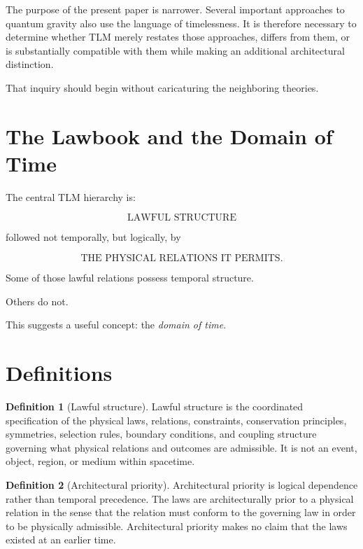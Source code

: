 \documentclass[12pt,onecolumn]{article}
\theoremstyle{plain}
\theoremstyle{definition}
\newtheorem{definition}{Definition}
\theoremstyle{remark}
\begin{document}
The purpose of the present paper is narrower. Several important approaches
to quantum gravity also use the language of timelessness. It is therefore
necessary to determine whether TLM merely restates those approaches, differs
from them, or is substantially compatible with them while making an
additional architectural distinction.

That inquiry should begin without caricaturing the neighboring theories.


\section{The Lawbook and the Domain of Time}

\label{sec:lawbook}

The central TLM hierarchy is:

\[
\boxed{\text{LAWFUL STRUCTURE}}
\]

followed not temporally, but logically, by

\[
\boxed{\text{THE PHYSICAL RELATIONS IT PERMITS}.}
\]

Some of those lawful relations possess temporal structure.

Others do not.

This suggests a useful concept: the \emph{domain of time}.

\section{Definitions}
\label{sec:definitions}

\begin{definition}[Lawful structure]
\label{def:lawfulstructure}
Lawful structure is the coordinated specification of the physical laws,
relations, constraints, conservation principles, symmetries, selection
rules, boundary conditions, and coupling structure governing what physical
relations and outcomes are admissible. It is not an event, object, region,
or medium within spacetime.
\end{definition}

\begin{definition}[Architectural priority]
\label{def:architecturalpriority}
Architectural priority is logical dependence rather than temporal
precedence. The laws are architecturally prior to a physical relation in
the sense that the relation must conform to the governing law in order to
be physically admissible. Architectural priority makes no claim that the
laws existed at an earlier time.
\end{definition}
\end{document}
